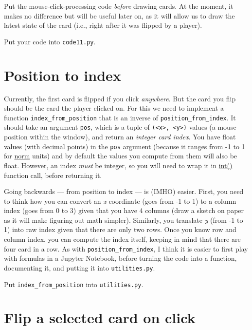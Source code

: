 \documentclass[
]{book}
\begin{document}
Put the mouse-click-processing code \emph{before} drawing cards. At the moment, it makes no difference but will be useful later on, as it will allow us to draw the latest state of the card (i.e., right after it was flipped by a player).

Put your code into \texttt{code11.py}.

\hypertarget{position-to-index}{%
\section{Position to index}\label{position-to-index}}

Currently, the first card is flipped if you click \emph{anywhere}. But the card you flip should be the card the player clicked on. For this we need to implement a function \texttt{index\_from\_position} that is an inverse of \texttt{position\_from\_index}. It should take an argument \texttt{pos}, which is a tuple of \texttt{(\textless{}x\textgreater{},\ \textless{}y\textgreater{})} values (a mouse position within the window), and return an \emph{integer card index}. You have float values (with decimal points) in the \texttt{pos} argument (because it ranges from -1 to 1 for \protect\hyperlink{psychopy-units-norm}{norm} units) and by default the values you compute from them will also be float. However, an index \emph{must} be integer, so you will need to wrap it in \href{https://docs.python.org/3/library/functions.html\#int}{int()} function call, before returning it.

Going backwards --- from position to index --- is (IMHO) easier. First, you need to think how you can convert an \emph{x} coordinate (goes from -1 to 1) to a column index (goes from 0 to 3) given that you have 4 columns (draw a sketch on paper as it will make figuring out math simpler). Similarly, you translate \emph{y} (from -1 to 1) into raw index given that there are only two rows. Once you know row and column index, you can compute the index itself, keeping in mind that there are four card in a row. As with \texttt{position\_from\_index}, I think it is easier to first play with formulas in a Jupyter Notebook, before turning the code into a function, documenting it, and putting it into \texttt{utilities.py}.

Put \texttt{index\_from\_position} into \texttt{utilities.py}.

\hypertarget{flip-a-selected-card-on-click}{%
\section{Flip a selected card on click}\label{flip-a-selected-card-on-click}}
\end{document}
